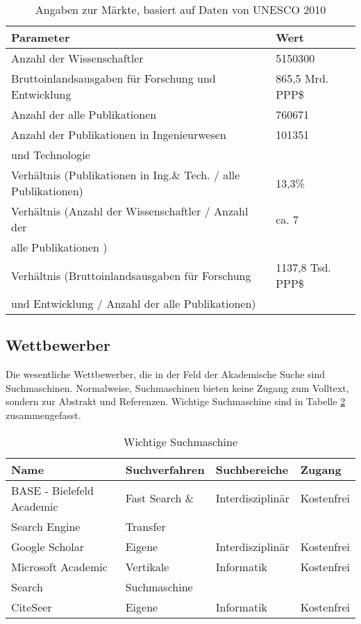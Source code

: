 \begin{table}[h!]
  \centering
  \begin{footnotesize}
  \begin{tabular}{|l|l|}\hline
   \textbf{Parameter} &  \textbf{Wert} \\ \hline
  Anzahl der Wissenschaftler & 5150300 \\ \hline
  Bruttoinlandsausgaben für Forschung und Entwicklung & 865,5 Mrd. PPP\$ \\ \hline
  Anzahl der alle Publikationen & 760671 \\ \hline
  Anzahl der Publikationen in Ingenieurwesen & 101351
 \\
  und Technologie& \\ \hline
  Verhältnis (Publikationen in Ing.\& Tech. / alle Publikationen) & 13,3\% \\ \hline
  Verhältnis (Anzahl der Wissenschaftler / Anzahl der & ca. 7 \\
  alle Publikationen ) & \\ \hline
  Verhältnis (Bruttoinlandsausgaben für Forschung & 1137,8 Tsd. PPP\$\\
  und Entwicklung / Anzahl der alle Publikationen) & \\ \hline
  \end{tabular}
  \end{footnotesize}
  \caption{Angaben zur Märkte, basiert auf Daten von UNESCO 2010}
  \label{tab:ABC3}
\end{table}
 

\subsection{Wettbewerber}
Die wesentliche Wettbewerber, die in der Feld der Akademische Suche sind Suchmaschinen. Normalweise, Suchmaschinen bieten keine Zugang zum Volltext, sondern zur Abstrakt und Referenzen. Wichtige Suchmaschine sind in Tabelle \ref{tab:wettSuch} zusammengefasst.
\begin{table}[h!]
  \centering
  \begin{footnotesize}
  \begin{tabular}{|l|l|l|l|}\hline
   \textbf{Name} &  \textbf{Suchverfahren} &  \textbf{Suchbereiche} &   \textbf{Zugang} \\ \hline
BASE - Bielefeld Academic  & Fast Search \& & Interdisziplinär & Kostenfrei \\
Search Engine & Transfer  & & \\ \hline
 Google Scholar & Eigene & Interdisziplinär & Kostenfrei\\\hline
 Microsoft Academic & Vertikale & Informatik & Kostenfrei \\
 Search & Suchmaschine & & \\ \hline
 CiteSeer & Eigene & Informatik & Kostenfrei \\ \hline
  \end{tabular}
    \end{footnotesize}
  \caption{Wichtige Suchmaschine}
  \label{tab:wettSuch}
\end{table} 
 
